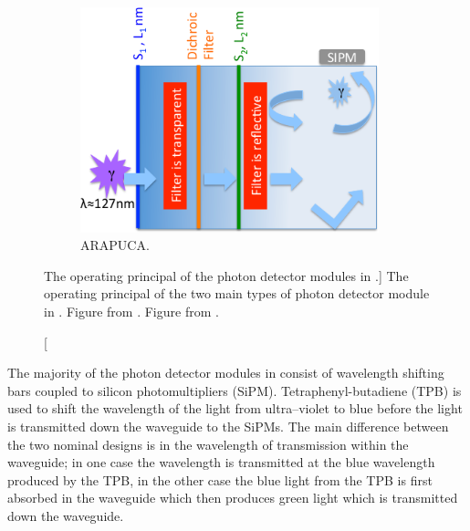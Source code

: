 \begin{figure}
\begin{subfigure}[b]{0.69\textwidth}
		\includegraphics[width=0.95\textwidth]{figures/pdsp_arapuca.png}
		\caption{ARAPUCA.}
		\label{fig:arapuca}
	\end{subfigure}

	\caption
	[The operating principal of the photon detector modules in \protodune{}.]
	{The operating principal of the two main types of photon detector module in 
	\protodune{}. Figure  from \cite{Abi2017}. Figure 
	 from \cite{Machado:2016jqe}.}

	\label{fig:pdsp_pd}

\end{figure}

The majority of the photon detector modules in \protodune{} consist of 
wavelength shifting bars coupled to silicon photomultipliers (SiPM). 
Tetraphenyl-butadiene (TPB) is used to shift the wavelength of the light 
from ultra--violet to blue before the light is transmitted down the waveguide to
the SiPMs. The main difference between the two nominal designs is in the 
wavelength of transmission within the waveguide; in one case the wavelength is 
transmitted at the blue wavelength produced by the TPB, in the other case the 
blue light from the TPB is first absorbed in the waveguide which then produces 
green light which is transmitted down the waveguide.

